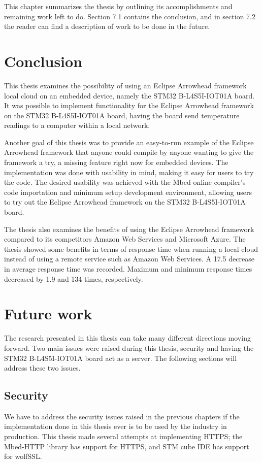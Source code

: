 This chapter summarizes the thesis by outlining its accomplishments and remaining work left to do.
Section 7.1 contains the conclusion, and in section 7.2 the reader can find a description of work to be done in the future.
\section{Conclusion}
This thesis examines the possibility of using an Eclipse Arrowhead framework local cloud on an embedded device, namely the STM32 B-L4S5I-IOT01A board. 
It was possible to implement functionality for the Eclipse Arrowhead framework on the STM32 B-L4S5I-IOT01A board, having the board send temperature readings to a computer within a local network.

Another goal of this thesis was to provide an easy-to-run example of the Eclipse Arrowhead framework that anyone could compile by anyone wanting to give the framework a try, a missing feature right now for embedded devices.
The implementation was done with usability in mind, making it easy for users to try the code.
The desired usability was achieved with the Mbed online compiler's code importation and minimum setup development environment, allowing users to try out the Eclipse Arrowhead framework on the STM32 B-L4S5I-IOT01A board.

The thesis also examines the benefits of using the Eclipse Arrowhead framework compared to its competitors Amazon Web Services and Microsoft Azure.
The thesis showed some benefits in terms of response time when running a local cloud instead of using a remote service such as Amazon Web Services. 
A 17.5 decrease in average response time was recorded.
Maximum and minimum response times decreased by 1.9 and 134 times, respectively.  

\section{Future work}
The research presented in this thesis can take many different directions moving forward.
Two main issues were raised during this thesis, security and having the STM32 B-L4S5I-IOT01A board act as a server.
The following sections will address these two issues.
\subsection{Security}
We have to address the security issues raised in the previous chapters if the implementation done in this thesis ever is to be used by the industry in production. 
This thesis made several attempts at implementing HTTPS; the Mbed-HTTP library has support for HTTPS, and STM cube IDE has support for wolfSSL. 

